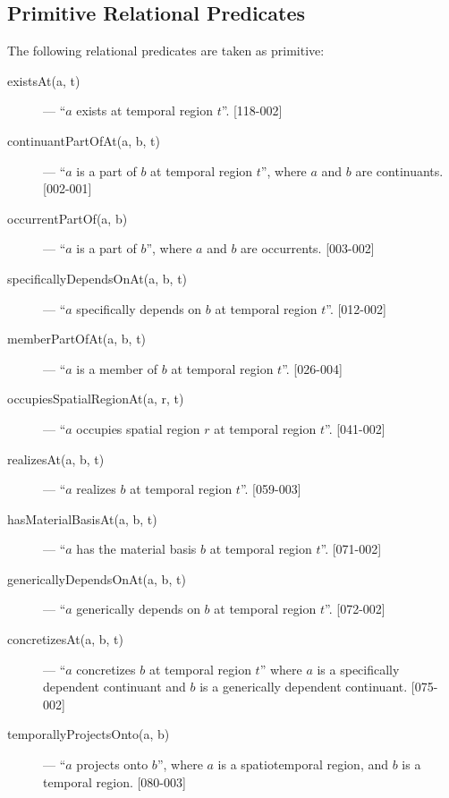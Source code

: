 \documentclass{article}
\begin{document}
\subsection{Primitive Relational Predicates}

The following relational predicates are taken as primitive:

\begin{description}

\item[existsAt(a, t)] --- ``$a$ exists at temporal region $t$''. [118-002]

\item[continuantPartOfAt(a, b, t)] --- ``$a$ is a part of $b$ at temporal region $t$'', where $a$ and $b$ are continuants. [002-001]

\item[occurrentPartOf(a, b)] --- ``$a$ is a part of $b$'', where $a$ and $b$ are occurrents. [003-002]

\item[specificallyDependsOnAt(a, b, t)] --- ``$a$ specifically depends on $b$ at temporal region $t$''. [012-002]

\item[memberPartOfAt(a, b, t)] --- ``$a$ is a member of $b$ at temporal region $t$''. [026-004]

\item[occupiesSpatialRegionAt(a, r, t)] --- ``$a$ occupies spatial region $r$ at temporal region $t$''. [041-002]

\item[realizesAt(a, b, t)] --- ``$a$ realizes $b$ at temporal region $t$''. [059-003]

\item[hasMaterialBasisAt(a, b, t)] --- ``$a$ has the material basis $b$ at temporal region $t$''. [071-002]

\item[genericallyDependsOnAt(a, b, t)] --- ``$a$ generically depends on $b$ at temporal region $t$''. [072-002]

\item[concretizesAt(a, b, t)] --- ``$a$ concretizes $b$ at temporal region $t$'' where $a$ is a specifically dependent continuant and $b$ is a generically dependent continuant. [075-002]

\item[temporallyProjectsOnto(a, b)] --- ``$a$ projects onto $b$'', where $a$ is a spatiotemporal region, and $b$ is a temporal region. [080-003]


\end{description}
\end{document}
